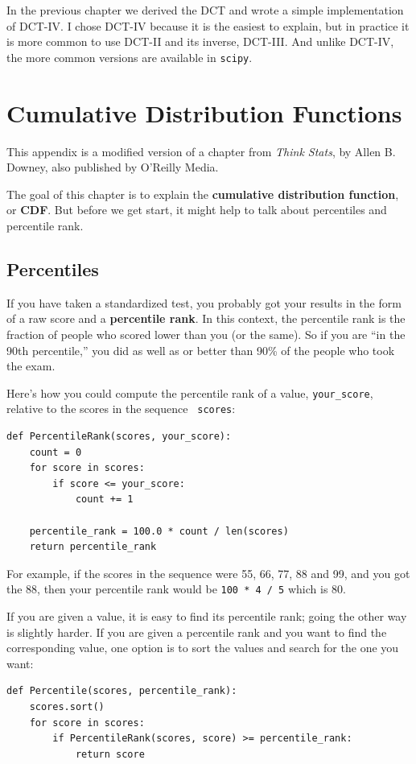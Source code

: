 \documentclass[12pt]{book}
\begin{document}
In the previous chapter we derived the DCT and wrote a simple
implementation of DCT-IV.  I chose DCT-IV because it is the
easiest to explain, but in practice it is more common to use
DCT-II and its inverse, DCT-III.  And unlike DCT-IV, the more
common versions are available in {\tt scipy}.


\appendix

\chapter{Cumulative Distribution Functions}

This appendix is a modified version of a chapter from
{\it Think Stats}, by Allen B. Downey, also published by
O'Reilly Media.

The goal of this chapter is to explain the {\bf cumulative
distribution function}, or {\bf CDF}.
But before we get start, it might help to 
talk about percentiles and percentile rank.


\section{Percentiles}

If you have taken a standardized test, you probably got your
results in the form of a raw score and a {\bf percentile rank}.
In this context, the percentile rank is the fraction of people who
scored lower than you (or the same).  So if you are ``in the 90th
percentile,'' you did as well as or better than 90\% of the people who
took the exam.

Here's how you could compute the percentile rank of a value,
\verb"your_score", relative to the scores in the sequence {\tt
  scores}:
%
\begin{verbatim}
def PercentileRank(scores, your_score):
    count = 0
    for score in scores:
        if score <= your_score:
            count += 1

    percentile_rank = 100.0 * count / len(scores)
    return percentile_rank
\end{verbatim}
%
%
For example, if the scores in the sequence were 55, 66, 77, 88 and 99,
and you got the 88, then your percentile rank would be {\tt 100 * 4 / 5}
which is 80.

If you are given a value, it is easy to find its percentile rank; going
the other way is slightly harder.  If you are given a percentile rank
and you want to find the corresponding value, one option is to
sort the values and search for the one you want:
%
\begin{verbatim}
def Percentile(scores, percentile_rank):
    scores.sort()
    for score in scores:
        if PercentileRank(scores, score) >= percentile_rank:
            return score
\end{verbatim}
\end{document}
